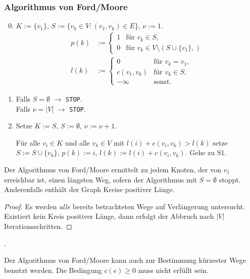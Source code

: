 \subsubsection*{Algorithmus von Ford/Moore}
\begin{enumerate}[S1]
  \setcounter{enumi}{-1}
\item $K := \{v_1\}$, $S := \{ v_k \in V : (v_1, v_k) \in E \}$, $\nu := 1$.
  \begin{align*}
    p(k) &:= \begin{cases}
      1 & \text{für } v_k \in S, \\
      0 & \text{für } v_k \in V \setminus ( S \cup \{ v_1 \}, )
    \end{cases} \\
    l(k) &:= \begin{cases}
      0 & \text{für } v_k = v_1, \\
      c(v_1, v_k) & \text{für } v_k \in S, \\
      -\infty & \text{sonst.}
    \end{cases}
  \end{align*}
\item Falls $S = \emptyset$ $\rightarrow$ \verb+STOP+.\\
  Falls $\nu = |V|$ $\rightarrow$ \verb+STOP+.
\item Setze $K := S$, $S := \emptyset$, $\nu := \nu + 1$.
  
  Für alle $v_i \in K$ und alle $v_k \in V$ mit $l(i) + c(v_i, v_k) > l(k)$
  setze $S := S \cup \{ v_k \}$, $p(k) := i$, $l(k) := l(i) + c(v_i, v_k)$. Gehe
  zu S1.
\end{enumerate}

\begin{aus}
  Der Algorithmus von Ford/Moore ermittelt zu jedem Knoten, der von $v_1$
  erreichbar ist, einen längsten Weg, sofern der Algorithmus mit $S = \emptyset$
  stoppt. Anderenfalls enthält der Graph Kreise positiver Länge.
\end{aus}

\begin{proof}
  Es werden \emph{alle} bereits betrachteten Wege auf Verlängerung untersucht.
  Existiert kein Kreis positiver Länge, dann erfolgt der Abbruch nach $|V|$
  Iterationsschritten. 
\end{proof}

\begin{exmp}
  .
\end{exmp}

\begin{rmrk*}
  Der Algorithmus von Ford/Moore kann auch zur Bestimmung kürzester Wege benutzt
  werden. Die Bedingung $c(e) \ge 0$ muss nicht erfüllt sein.
\end{rmrk*}

